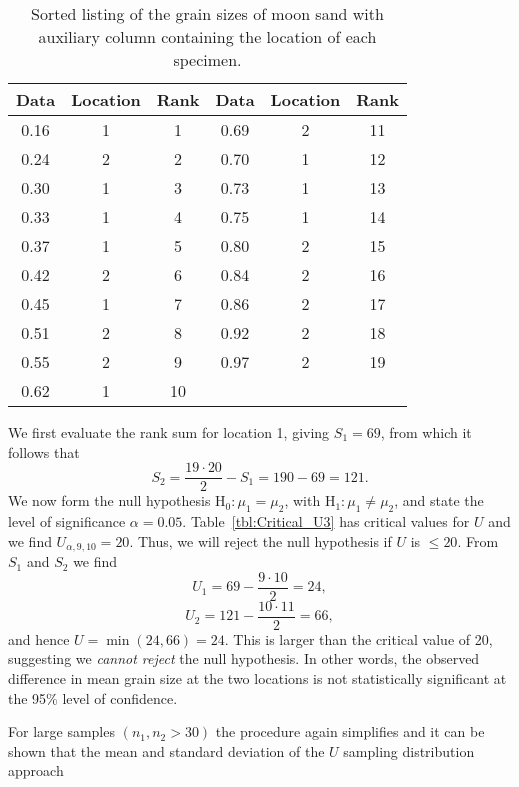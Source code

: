 \begin{example}
\begin{table}[h]
\centering
\begin{tabular}{|c|c|c||c|c|c|} \hline
\bf{Data} & \bf{Location} & \bf{Rank} & \bf{Data} & \bf{Location} & \bf{Rank}\\ \hline
0.16 & 1 & 1  & 0.69 & 2 & 11 \\ \hline
0.24 & 2 & 2  & 0.70 & 1 & 12 \\ \hline
0.30 & 1 & 3  & 0.73 & 1 & 13 \\ \hline
0.33 & 1 & 4  & 0.75 & 1 & 14 \\ \hline
0.37 & 1 & 5  & 0.80 & 2 & 15 \\ \hline
0.42 & 2 & 6  & 0.84 & 2 & 16 \\ \hline
0.45 & 1 & 7  & 0.86 & 2 & 17 \\ \hline
0.51 & 2 & 8  & 0.92 & 2 & 18 \\ \hline
0.55 & 2 & 9  & 0.97 & 2 & 19 \\ \hline
0.62 & 1 & 10 &      &   &    \\ \hline
\end{tabular}
\caption{Sorted listing of the grain sizes of moon sand with auxiliary column containing the location of each specimen.}
\label{tbl:moonsand}
\end{table}
We first evaluate the rank sum for location 1, giving $S_1 = 69$, from which it follows that
\begin{equation}
S_2 = \frac{19 \cdot 20}{2} - S_1 = 190 - 69 = 121.
\end{equation}	 
We now form the null hypothesis H$_0: \mu_1 = \mu_2$, with H$_1: \mu_1 \neq \mu_2$, and state the level of 
significance $\alpha = 0.05$.  Table~\ref{tbl:Critical_U3} has critical values for $U$ and we find $U_{\alpha, 9, 10} = 20$.
Thus, we will reject the null hypothesis if $U$ is $\leq 20$.  From $S_1$ and $S_2$ we find 
\begin{equation}
U_1 = 69 - \frac{9\cdot 10}{2} = 24,
\end{equation}	  
\begin{equation}
U_2 = 121 - \frac{10 \cdot 11}{2} = 66,
\end{equation}
and hence $U = \min(24, 66) = 24$.  This is larger than the critical value of 20, suggesting we 
\emph{cannot reject} the null hypothesis.  In other words, the observed difference in mean grain size at the two locations is 
not statistically significant at the 95\% level of confidence.
\end{example}
	For large samples $(n_1, n_2 > 30)$ the procedure again simplifies and it can be shown that the mean and 
standard deviation of the $U$ sampling distribution approach

